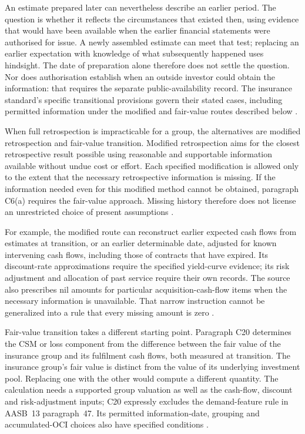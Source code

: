 An estimate prepared later can nevertheless describe an earlier period. The
question is whether it reflects the circumstances that existed then, using
evidence that would have been available when the earlier financial statements
were authorised for issue. A newly assembled estimate can meet that test;
replacing an earlier expectation with knowledge of what subsequently happened
uses hindsight. The date of preparation alone therefore does not settle the
question. Nor does authorisation establish when an outside investor could
obtain the information: that requires the separate public-availability record.
The insurance standard's specific transitional provisions govern their stated
cases, including permitted information under the modified and fair-value
routes described below
\citep[paragraphs~7, 19(a) and 50--53]{aasb108comp2022}.

When full retrospection is impracticable for a group, the alternatives are
modified retrospection and fair-value transition. Modified retrospection aims
for the closest retrospective result possible using reasonable and supportable
information available without undue cost or effort. Each specified modification
is allowed only to the extent that the necessary retrospective information is
missing. If the information needed even for this modified method cannot be
obtained, paragraph C6(a) requires the fair-value approach. Missing history
therefore does not license an unrestricted choice of present assumptions
\citep[paragraphs C5--C8]{aasb17}.

For example, the modified route can reconstruct earlier expected cash flows
from estimates at transition, or an earlier determinable date, adjusted for
known intervening cash flows, including those of contracts that have expired.
Its discount-rate approximations require the specified yield-curve evidence;
its risk adjustment and allocation of past service require their own records.
The source also prescribes nil amounts for particular acquisition-cash-flow
items when the necessary information is unavailable. That narrow instruction
cannot be generalized into a rule that every missing amount is zero
\citep[paragraphs C12--C16]{aasb17}.

Fair-value transition takes a different starting point. Paragraph C20 determines
the CSM or loss component from the difference between the fair value of the
insurance group and its fulfilment cash flows, both measured at transition.
The insurance group's fair value is distinct from the value of its underlying
investment pool. Replacing one with the other would compute a different
quantity. The calculation needs a supported group valuation as well as the
cash-flow, discount and risk-adjustment inputs; C20 expressly excludes the
demand-feature rule in AASB~13 paragraph~47. Its permitted information-date,
grouping and accumulated-OCI choices also have specified conditions
\citep[paragraphs C20--C24B]{aasb17}.

